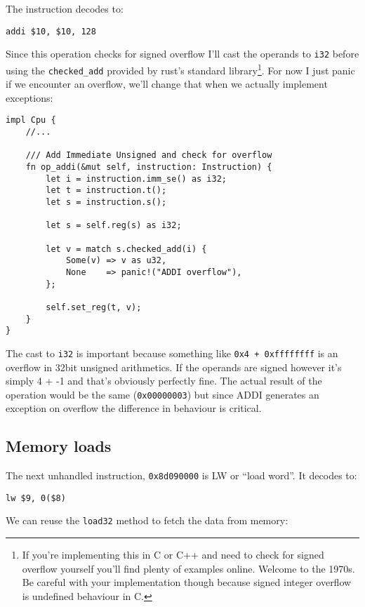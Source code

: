 \documentclass[a4paper]{article}
\newcommand{\code}[1] {\texttt{#1}}
\begin{document}
The instruction decodes to:
\begin{lstlisting}[language=assembly]
addi $10, $10, 128
\end{lstlisting}

Since this operation checks for signed overflow I'll cast the operands
to \code{i32} before using the \code{checked\_add} provided by
rust's standard library\footnote{If you're implementing this in C or
  C++ and need to check for signed overflow yourself you'll find
  plenty of examples online. Welcome to the 1970s. Be careful with
  your implementation though because signed integer overflow is
  undefined behaviour in C.}. For now I just panic if we encounter an
  overflow, we'll change that when we actually implement exceptions:

\begin{lstlisting}
impl Cpu {
    //...

    /// Add Immediate Unsigned and check for overflow
    fn op_addi(&mut self, instruction: Instruction) {
        let i = instruction.imm_se() as i32;
        let t = instruction.t();
        let s = instruction.s();

        let s = self.reg(s) as i32;

        let v = match s.checked_add(i) {
            Some(v) => v as u32,
            None    => panic!("ADDI overflow"),
        };

        self.set_reg(t, v);
    }
}
\end{lstlisting}

The cast to \code{i32} is important because something like
\code{0x4 + 0xffffffff} is an overflow in 32bit unsigned
arithmetics. If the operands are signed however it's simply 4 + -1 and
that's obviously perfectly fine. The actual result of the operation
would be the same (\code{0x00000003}) but since ADDI generates an
exception on overflow the difference in behaviour is critical.

\subsection{Memory loads}

The next unhandled instruction, \code{0x8d090000} is LW or ``load
word''. It decodes to:

\begin{lstlisting}[language=assembly]
lw $9, 0($8)
\end{lstlisting}

We can reuse the \code{load32} method to fetch the data from memory:
\end{document}
